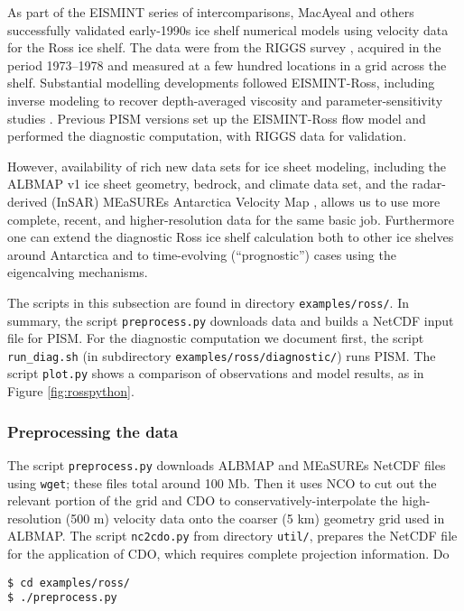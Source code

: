 As part of the EISMINT series of intercomparisons, MacAyeal and others \cite{MacAyealetal} successfully validated early-1990s ice shelf numerical models using velocity data for the Ross ice shelf.  The data were from the RIGGS survey \cite{RIGGS2}, acquired in the period 1973--1978 and measured at a few hundred locations in a grid across the shelf.  Substantial modelling developments followed EISMINT-Ross, including inverse modeling to recover depth-averaged viscosity \cite{RommelaereMacAyeal} and parameter-sensitivity studies \cite{HumbertGreveHutter}.  Previous PISM versions set up the EISMINT-Ross flow model and performed the diagnostic computation, with RIGGS data for validation.

However, availability of rich new data sets for ice sheet modeling, including the ALBMAP v1 \cite{LeBrocqetal2010} ice sheet geometry, bedrock, and climate data set, and the radar-derived (InSAR) MEaSUREs Antarctica Velocity Map \cite{Rignotetal2011}, allows us to use more complete, recent, and higher-resolution data for the same basic job.  Furthermore one can extend the diagnostic Ross ice shelf calculation both to other ice shelves around Antarctica and to time-evolving (``prognostic'') cases using the eigencalving \cite{Levermannetal2012} mechanisms.

The scripts in this subsection are found in directory \texttt{examples/ross/}.  In summary, the script \texttt{preprocess.py} downloads data and builds a NetCDF input file for PISM.  For the diagnostic computation we document first, the script \texttt{run_diag.sh} (in subdirectory \texttt{examples/ross/diagnostic/}) runs PISM.  The script \texttt{plot.py} shows a comparison of observations and model results, as in Figure \ref{fig:rosspython}.

\subsubsection*{Preprocessing the data}  The script \texttt{preprocess.py} downloads ALBMAP and MEaSUREs NetCDF files using \texttt{wget}; these files total around 100 Mb.  Then it uses NCO to cut out the relevant portion of the grid and CDO to conservatively-interpolate the high-resolution (500 m) velocity data onto the coarser (5 km) geometry grid used in ALBMAP.  The script \texttt{nc2cdo.py} from directory \texttt{util/}, prepares the NetCDF file for the application of CDO, which requires complete projection information.  Do

\begin{verbatim}
$ cd examples/ross/
$ ./preprocess.py
\end{verbatim}

